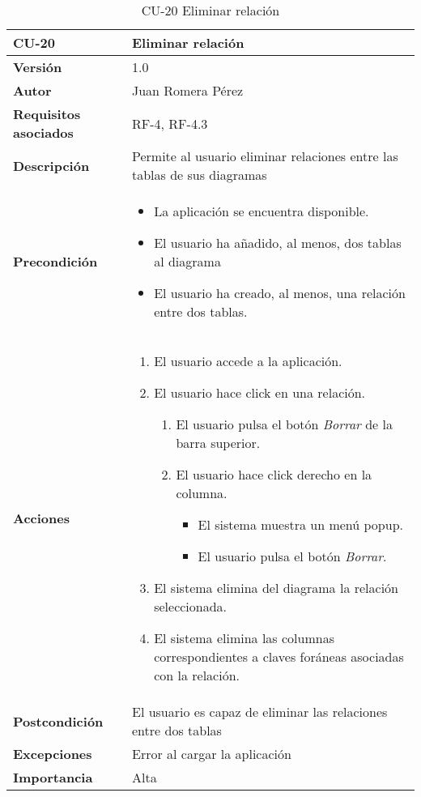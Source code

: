 \begin{table}[p]
    \centering
    \begin{tabularx}{\linewidth}{ p{} p{}}
		\toprule
		\textbf{CU-20}    & \textbf{Eliminar relación}\\
		\toprule
		\textbf{Versión}              & 1.0    \\
		\textbf{Autor}                & Juan Romera Pérez \\
		\textbf{Requisitos asociados} & RF-4, RF-4.3 \\
		\textbf{Descripción}          & Permite al usuario eliminar relaciones entre las tablas de sus diagramas \\
		\textbf{Precondición}         & \begin{itemize}
		    \item La aplicación se encuentra disponible.
            \item El usuario ha añadido, al menos, dos tablas al diagrama
            \item El usuario ha creado, al menos, una relación entre dos tablas.
		\end{itemize} \\
		\textbf{Acciones}             &
		\begin{enumerate}
			\def\labelenumi{\arabic{enumi}.}
			\tightlist
			\item El usuario accede a la aplicación.
            \item El usuario hace click en una relación.
            \begin{enumerate}
                \item El usuario pulsa el botón \emph{Borrar} de la barra superior.
                \item El usuario hace click derecho en la columna.
                \begin{itemize}
                    \item El sistema muestra un menú popup.
                    \item El usuario pulsa el botón \emph{Borrar}.
                \end{itemize}
            \end{enumerate}
            \item El sistema elimina del diagrama la relación seleccionada.
            \item El sistema elimina las columnas correspondientes a claves foráneas asociadas con la relación.
		\end{enumerate}\\
		\textbf{Postcondición}        & El usuario es capaz de eliminar las relaciones entre dos tablas \\
		\textbf{Excepciones}          & Error al cargar la aplicación \\
		\textbf{Importancia}          & Alta \\
		\bottomrule
    \end{tabularx}
    \caption{CU-20 Eliminar relación}
\end{table}

